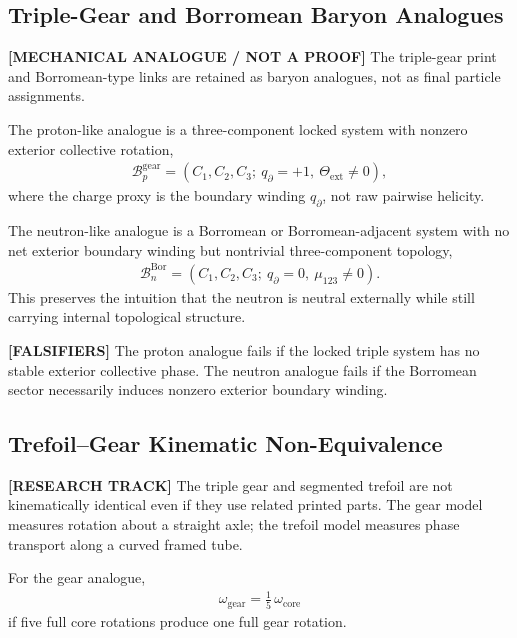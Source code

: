 \subsection{Triple-Gear and Borromean Baryon Analogues}
\label{subsec:rt_triple_gear_borromean_baryons}

\textbf{[MECHANICAL ANALOGUE / NOT A PROOF]} The triple-gear print and Borromean-type links are retained as baryon analogues, not as final particle assignments.

The proton-like analogue is a three-component locked system with nonzero exterior collective rotation,
\begin{align}
    \mathcal{B}_{p}^{\mathrm{gear}}
    =
    (C_1,C_2,C_3;\ q_{\partial}=+1,\ \Theta_{\mathrm{ext}}\neq 0),
\end{align}
where the charge proxy is the boundary winding $q_{\partial}$, not raw pairwise helicity.

The neutron-like analogue is a Borromean or Borromean-adjacent system with no net exterior boundary winding but nontrivial three-component topology,
\begin{align}
    \mathcal{B}_{n}^{\mathrm{Bor}}
    =
    (C_1,C_2,C_3;\ q_{\partial}=0,\ \mu_{123}\neq 0).
\end{align}
This preserves the intuition that the neutron is neutral externally while still carrying internal topological structure.

\textbf{[FALSIFIERS]} The proton analogue fails if the locked triple system has no stable exterior collective phase. The neutron analogue fails if the Borromean sector necessarily induces nonzero exterior boundary winding.

\subsection{Trefoil--Gear Kinematic Non-Equivalence}
\label{subsec:rt_trefoil_gear_kinematic_nonequivalence}

\textbf{[RESEARCH TRACK]} The triple gear and segmented trefoil are not kinematically identical even if they use related printed parts. The gear model measures rotation about a straight axle; the trefoil model measures phase transport along a curved framed tube.

For the gear analogue,
\begin{align}
    \omega_{\mathrm{gear}}
    =
    \frac{1}{5}\,\omega_{\mathrm{core}}
\end{align}
if five full core rotations produce one full gear rotation.


